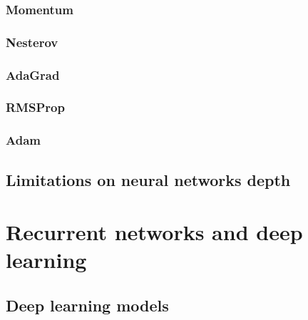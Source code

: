 \subsubsection{Momentum}
\subsubsection{Nesterov}
\subsubsection{AdaGrad}
\subsubsection{RMSProp}
\subsubsection{Adam}

\subsection{Limitations on neural networks depth}


\section{Recurrent networks and deep learning}

\subsection{Deep learning models}

